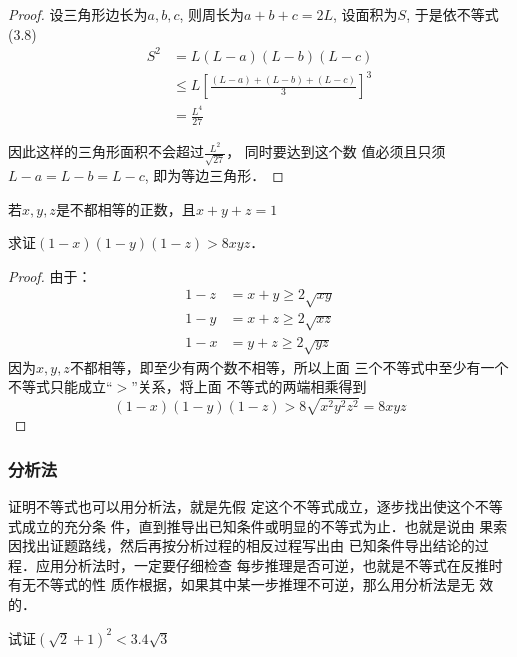 \begin{proof}
    设三角形边长为$a,b,c$, 则周长为$a+b+c=2L$,
设面积为$S$, 于是依不等式(3.8)
\[\begin{split}
    S^2&=L(L-a)(L-b)(L-c)\\
&\le L\left[\frac{(L-a)+(L-b)+(L-c)}{3}\right]^3\\
&=\frac{L^4}{27}
\end{split}\]

因此这样的三角形面积不会超过$\frac{L^2}{\sqrt{27}}$，
同时要达到这个数
值必须且只须$L-a=L-b=L-c$, 即为等边三角形．
\end{proof}
    
\begin{example}
    若$x,y,z$是不都相等的正数，且$x+y+z=1$

求证$(1-x)(1-y)(1-z)>8xyz$．
\end{example}

\begin{proof}
由于：
\[\begin{split}
    1-z&=x+y\ge 2\sqrt{xy}\\
1-y&=x+z\ge 2\sqrt{xz}\\
1-x&=y+z\ge 2\sqrt{yz}
\end{split}\]   
因为$x,y,z$不都相等，即至少有两个数不相等，所以上面
三个不等式中至少有一个不等式只能成立“$>$”关系，将上面
不等式的两端相乘得到
\[(1-x)(1-y)(1-z)>8\sqrt{x^2y^2z^2}=8xyz\]
\end{proof}

\subsubsection{分析法}
证明不等式也可以用分析法，就是先假
定这个不等式成立，逐步找出使这个不等式成立的充分条
件，直到推导出已知条件或明显的不等式为止．也就是说由
果索因找出证题路线，然后再按分析过程的相反过程写出由
已知条件导出结论的过程．应用分析法时，一定要仔细检查
每步推理是否可逆，也就是不等式在反推时有无不等式的性
质作根据，如果其中某一步推理不可逆，那么用分析法是无
效的．



\begin{example}
    试证$\left(\sqrt{2}+1\right)^2 <3.4\sqrt{3}$

\end{example}

